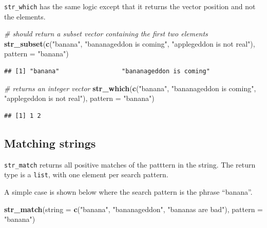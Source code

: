\documentclass[]{book}
\newenvironment{Shaded}{}{}
\newcommand{\CommentTok}[1]{\textcolor[rgb]{0.38,0.63,0.69}{\textit{#1}}}
\newcommand{\DataTypeTok}[1]{\textcolor[rgb]{0.56,0.13,0.00}{#1}}
\newcommand{\KeywordTok}[1]{\textcolor[rgb]{0.00,0.44,0.13}{\textbf{#1}}}
\newcommand{\NormalTok}[1]{#1}
\newcommand{\StringTok}[1]{\textcolor[rgb]{0.25,0.44,0.63}{#1}}
\begin{document}
\texttt{str\_which} has the same logic except that it returns the vector position and not the elements.

\begin{Shaded}
\begin{Highlighting}[]
\CommentTok{# should return a subset vector containing the first two elements}
\KeywordTok{str_subset}\NormalTok{(}\KeywordTok{c}\NormalTok{(}\StringTok{"banana"}\NormalTok{,}
             \StringTok{"bananageddon is coming"}\NormalTok{,}
             \StringTok{"applegeddon is not real"}\NormalTok{),}
           \DataTypeTok{pattern =} \StringTok{"banana"}\NormalTok{)}
\end{Highlighting}
\end{Shaded}

\begin{verbatim}
## [1] "banana"                 "bananageddon is coming"
\end{verbatim}

\begin{Shaded}
\begin{Highlighting}[]
\CommentTok{# returns an integer vector}
\KeywordTok{str_which}\NormalTok{(}\KeywordTok{c}\NormalTok{(}\StringTok{"banana"}\NormalTok{,}
            \StringTok{"bananageddon is coming"}\NormalTok{,}
            \StringTok{"applegeddon is not real"}\NormalTok{),}
          \DataTypeTok{pattern =} \StringTok{"banana"}\NormalTok{)}
\end{Highlighting}
\end{Shaded}

\begin{verbatim}
## [1] 1 2
\end{verbatim}

\hypertarget{matching-strings}{%
\subsection{Matching strings}\label{matching-strings}}

\texttt{str\_match} returns all positive matches of the patttern in the string.
The return type is a \texttt{list}, with one element per search pattern.

A simple case is shown below where the search pattern is the phrase ``banana''.

\begin{Shaded}
\begin{Highlighting}[]
\KeywordTok{str_match}\NormalTok{(}\DataTypeTok{string =} \KeywordTok{c}\NormalTok{(}\StringTok{"banana"}\NormalTok{,}
                     \StringTok{"bananageddon"}\NormalTok{,}
                     \StringTok{"bananas are bad"}\NormalTok{),}
          \DataTypeTok{pattern =} \StringTok{"banana"}\NormalTok{)}
\end{Highlighting}
\end{Shaded}
\end{document}
